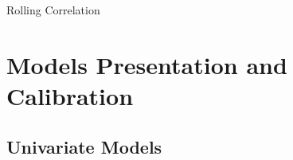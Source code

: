 \documentclass[c, 10pt]{beamer}
\begin{document}
\begin{frame}{Rolling Correlation}

\begin{figure}
	\centering
	\noindent{}
\end{figure}
\begin{figure}
	\centering
	\noindent{}
\end{figure}
\end{frame}


\section{Models Presentation and Calibration}
\subsection{Univariate Models}
\end{document}
